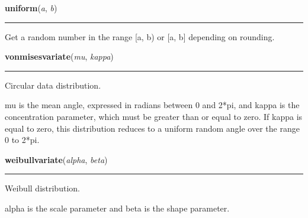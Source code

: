     \label{random:uniform}

    \vspace{0.5ex}

\hspace{.8\funcindent}\begin{boxedminipage}{\funcwidth}

    \raggedright \textbf{uniform}(\textit{a}, \textit{b})

    \vspace{-1.5ex}

    \rule{\textwidth}{0.5\fboxrule}
\setlength{\parskip}{2ex}
    Get a random number in the range [a, b) or [a, b] depending on 
    rounding.

\setlength{\parskip}{1ex}
    \end{boxedminipage}

    \label{random:vonmisesvariate}

    \vspace{0.5ex}

\hspace{.8\funcindent}\begin{boxedminipage}{\funcwidth}

    \raggedright \textbf{vonmisesvariate}(\textit{mu}, \textit{kappa})

    \vspace{-1.5ex}

    \rule{\textwidth}{0.5\fboxrule}
\setlength{\parskip}{2ex}
    Circular data distribution.

    mu is the mean angle, expressed in radians between 0 and 2*pi, and 
    kappa is the concentration parameter, which must be greater than or 
    equal to zero.  If kappa is equal to zero, this distribution reduces to
    a uniform random angle over the range 0 to 2*pi.

\setlength{\parskip}{1ex}
    \end{boxedminipage}

    \label{random:weibullvariate}

    \vspace{0.5ex}

\hspace{.8\funcindent}\begin{boxedminipage}{\funcwidth}

    \raggedright \textbf{weibullvariate}(\textit{alpha}, \textit{beta})

    \vspace{-1.5ex}

    \rule{\textwidth}{0.5\fboxrule}
\setlength{\parskip}{2ex}
    Weibull distribution.

    alpha is the scale parameter and beta is the shape parameter.

\setlength{\parskip}{1ex}
    \end{boxedminipage}


